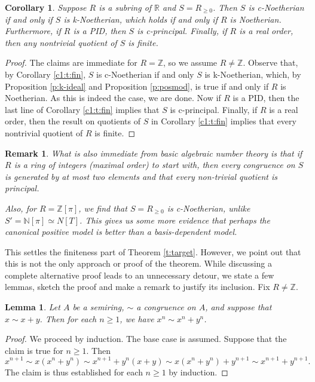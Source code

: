 \documentclass[notitlepage, 10pt]{article}
\theoremstyle{defin}
\theoremstyle{theo}
\newtheorem{lem}{Lemma}[defn]
\newtheorem{cor}{Corollary}[defn]
\theoremstyle{rema}
\newtheorem{rem}{Remark}[section]
\newcommand{\R}{\mathbb{R}}
\newcommand{\N}{\mathbb{N}}
\newcommand{\Z}{\mathbb{Z}}
\begin{document}
\begin{cor}
    \label{c2:t:fin}
    Suppose $R$ is a subring of $\R$ and $S=R_{\geq 0}$. Then $S$ is c-Noetherian if and only if $S$ is k-Noetherian, which holds if and only if $R$ is Noetherian. Furthermore, if $R$ is a PID, then $S$ is c-principal. Finally, if $R$ is a real order, then any nontrivial quotient of $S$ is finite. 
\end{cor}

\begin{proof}
    The claims are immediate for $R=\Z$, so we assume $R\neq \Z$. Observe that, by Corollary \ref{c1:t:fin}, $S$ is c-Noetherian if and only $S$ is k-Noetherian, which, by Proposition \ref{p:k-ideal} and Proposition \ref{p:posmod}, is true if and only if $R$ is Noetherian. As this is indeed the case, we are done. Now if $R$ is a PID, then the last line of Corollary \ref{c1:t:fin} implies that $S$ is c-principal. Finally, if $R$ is a real order, then the result on quotients of $S$ in Corollary \ref{c1:t:fin} implies that every nontrivial quotient of $R$ is finite.
\end{proof}

\begin{rem}
    What is also immediate from basic algebraic number theory is that if $R$ is a ring of integers (maximal order) to start with, then every congruence on $S$ is generated by at most two elements and that every non-trivial quotient is principal. 
    
    Also, for $R=\Z[\pi]$, we find that $S=R_{\geq 0}$ is c-Noetherian, unlike $S'=\N[\pi]\simeq N[T]$. This gives us some more evidence that perhaps the canonical positive model is better than a basis-dependent model.
\end{rem}

This settles the finiteness part of Theorem \ref{t:target}. However, we point out that this is not the only approach or proof of the theorem. While discussing a complete alternative proof leads to an unnecessary detour, we state a few lemmas, sketch the proof and make a remark to justify its inclusion. Fix $R\neq \Z$.

\begin{lem}
    \label{lem7.1}
    Let $A$ be a semiring, $\sim$ a congruence on $A$, and suppose that $x\sim x+y$. Then for each $n\geq 1$, we have $x^n \sim x^n +y^n$.
\end{lem}

\begin{proof}
    We proceed by induction. The base case is assumed. Suppose that the claim is true for $n\geq 1$. Then 
    $$x^{n+1} \sim x(x^n+y^n) \sim x^{n+1} + y^n(x+y)\sim x(x^n+y^n)+y^{n+1}\sim x^{n+1}+y^{n+1}.$$
    The claim is thus established for each $n\geq 1$ by induction.
\end{proof}
\end{document}
